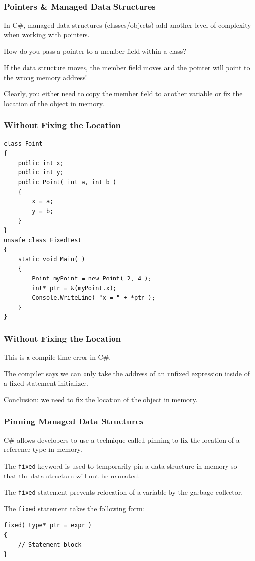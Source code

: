 \begin{frame}
\frametitle{Pointers \& Managed Data Structures}
In C\#, managed data structures (classes/objects) add another level of complexity when working with pointers.

How do you pass a pointer to a member field within a class?

If the data structure moves, the member field moves and the pointer will point to the wrong memory address!

Clearly, you either need to copy the member field to another variable or fix the location of the object in memory.

\end{frame}

\begin{frame}[fragile]
\frametitle{Without Fixing the Location}
{\scriptsize
\begin{verbatim}
class Point
{
    public int x;
    public int y;
    public Point( int a, int b )
    {
        x = a;
        y = b;
    }
}
unsafe class FixedTest
{
    static void Main( )
    {
        Point myPoint = new Point( 2, 4 );
        int* ptr = &(myPoint.x);
        Console.WriteLine( "x = " + *ptr );
    }
}	
\end{verbatim}
}
\end{frame}

\begin{frame}
\frametitle{Without Fixing the Location}

This is a compile-time error in C\#.

The compiler says we can only take the address of an unfixed expression inside of a fixed statement initializer.

Conclusion: we need to fix the location of the object in memory.

\end{frame}


\begin{frame}[fragile]
\frametitle{Pinning Managed Data Structures}
C\# allows developers to use a technique called \alert{pinning} to fix the location of a reference type in memory.

The \texttt{fixed} keyword is used to temporarily pin a data structure in memory so that the data structure will not be relocated.

The \texttt{fixed} statement prevents relocation of a variable by the garbage collector.

The \texttt{fixed} statement takes the following form:
\begin{verbatim}
fixed( type* ptr = expr )
{
    // Statement block
}
\end{verbatim}
\end{frame}

